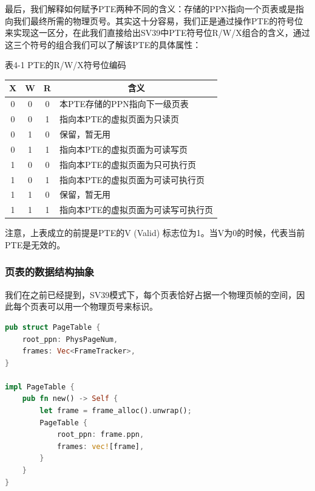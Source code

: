 最后，我们解释如何赋予PTE两种不同的含义：存储的PPN指向一个页表或是指向我们最终所需的物理页号。其实这十分容易，我们正是通过操作PTE的符号位来实现这一区分，在此我们直接给出SV39中PTE符号位R/W/X组合的含义，通过这三个符号的组合我们可以了解该PTE的具体属性：

\begin{table}[h]
\begin{center}
表4-1 PTE的R/W/X符号位编码 \\
\begin{tabular}{|c|cc|c}
	\hline
	X & \multicolumn{1}{c|}{W} & R & \multicolumn{1}{c|}{含义} \\
	\hline
	0 & \multicolumn{1}{c|}{0} & 0 & \multicolumn{1}{l|}{本PTE存储的PPN指向下一级页表} \\
	0 & \multicolumn{1}{c|}{0} & 1 & \multicolumn{1}{l|}{指向本PTE的虚拟页面为只读页} \\
	0 & \multicolumn{1}{c|}{1} & 0 & \multicolumn{1}{l|}{保留，暂无用} \\
	0 & \multicolumn{1}{c|}{1} & 1 & \multicolumn{1}{l|}{指向本PTE的虚拟页面为可读写页} \\
	1 & \multicolumn{1}{c|}{0} & 0 & \multicolumn{1}{l|}{指向本PTE的虚拟页面为只可执行页} \\
	1 & \multicolumn{1}{c|}{0} & 1 & \multicolumn{1}{l|}{指向本PTE的虚拟页面为可读可执行页} \\
	1 & \multicolumn{1}{c|}{1} & 0 & \multicolumn{1}{l|}{保留，暂无用} \\
	1 & \multicolumn{1}{c|}{1} & 1 & \multicolumn{1}{l|}{指向本PTE的虚拟页面为可读写可执行页} \\
	\hline
\end{tabular}
\end{center}
\end{table}\FloatBarrier

注意，上表成立的前提是PTE的V (Valid) 标志位为1。当V为0的时候，代表当前PTE是无效的。

\subsubsection{页表的数据结构抽象}

我们在之前已经提到，SV39模式下，每个页表恰好占据一个物理页帧的空间，因此每个页表可以用一个物理页号来标识。

\begin{lstlisting}[language={Rust}, label={code:pagetable},
	caption={os/src/mm/page\_table.rs}]
pub struct PageTable {
	root_ppn: PhysPageNum,
	frames: Vec<FrameTracker>,
}

impl PageTable {
	pub fn new() -> Self {
		let frame = frame_alloc().unwrap();
		PageTable {
			root_ppn: frame.ppn,
			frames: vec![frame],
		}
	}
}
\end{lstlisting}

